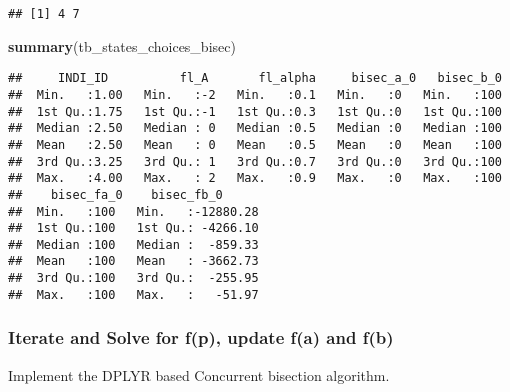 \documentclass[]{article}
\newenvironment{Shaded}{\begin{snugshade}}{\end{snugshade}}
\newcommand{\KeywordTok}[1]{\textcolor[rgb]{0.13,0.29,0.53}{\textbf{#1}}}
\newcommand{\NormalTok}[1]{#1}
\begin{document}
\begin{verbatim}
## [1] 4 7
\end{verbatim}

\begin{Shaded}
\begin{Highlighting}[]
\KeywordTok{summary}\NormalTok{(tb_states_choices_bisec)}
\end{Highlighting}
\end{Shaded}

\begin{verbatim}
##     INDI_ID          fl_A       fl_alpha     bisec_a_0   bisec_b_0  
##  Min.   :1.00   Min.   :-2   Min.   :0.1   Min.   :0   Min.   :100  
##  1st Qu.:1.75   1st Qu.:-1   1st Qu.:0.3   1st Qu.:0   1st Qu.:100  
##  Median :2.50   Median : 0   Median :0.5   Median :0   Median :100  
##  Mean   :2.50   Mean   : 0   Mean   :0.5   Mean   :0   Mean   :100  
##  3rd Qu.:3.25   3rd Qu.: 1   3rd Qu.:0.7   3rd Qu.:0   3rd Qu.:100  
##  Max.   :4.00   Max.   : 2   Max.   :0.9   Max.   :0   Max.   :100  
##    bisec_fa_0    bisec_fb_0       
##  Min.   :100   Min.   :-12880.28  
##  1st Qu.:100   1st Qu.: -4266.10  
##  Median :100   Median :  -859.33  
##  Mean   :100   Mean   : -3662.73  
##  3rd Qu.:100   3rd Qu.:  -255.95  
##  Max.   :100   Max.   :   -51.97
\end{verbatim}

\hypertarget{iterate-and-solve-for-fp-update-fa-and-fb}{%
\subsubsection{Iterate and Solve for f(p), update f(a) and
f(b)}\label{iterate-and-solve-for-fp-update-fa-and-fb}}

Implement the DPLYR based Concurrent bisection algorithm.
\end{document}
